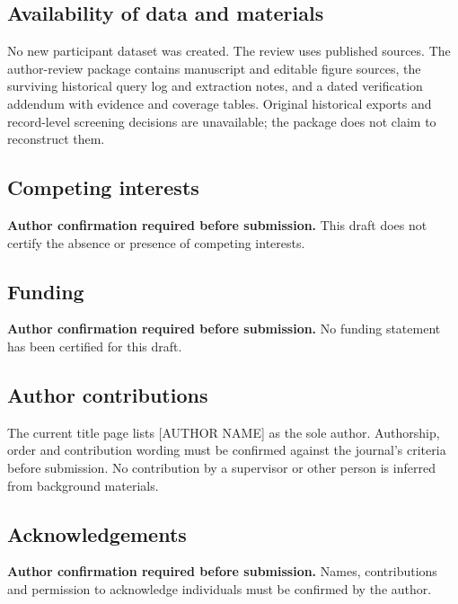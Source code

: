 \documentclass[11pt,a4paper]{article}
\begin{document}
\subsection*{Availability of data and materials}
No new participant dataset was created. The review uses published sources. The author-review package contains manuscript and editable figure sources, the surviving historical query log and extraction notes, and a dated verification addendum with evidence and coverage tables. Original historical exports and record-level screening decisions are unavailable; the package does not claim to reconstruct them.

\subsection*{Competing interests}
\textbf{Author confirmation required before submission.} This draft does not certify the absence or presence of competing interests.

\subsection*{Funding}
\textbf{Author confirmation required before submission.} No funding statement has been certified for this draft.

\subsection*{Author contributions}
The current title page lists [AUTHOR NAME] as the sole author. Authorship, order and contribution wording must be confirmed against the journal's criteria before submission. No contribution by a supervisor or other person is inferred from background materials.

\subsection*{Acknowledgements}
\textbf{Author confirmation required before submission.} Names, contributions and permission to acknowledge individuals must be confirmed by the author.
\end{document}
